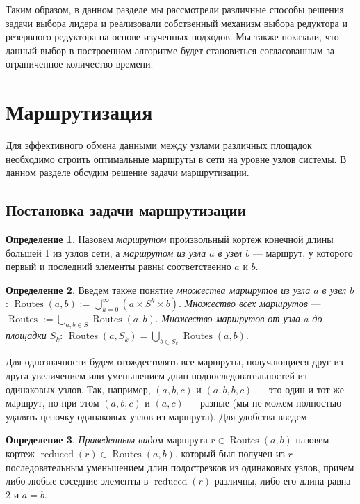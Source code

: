 \documentclass{article}
\theoremstyle{plain}
\theoremstyle{plain}
\theoremstyle{plain}
\theoremstyle{plain}
\theoremstyle{definition}
\newtheorem{definition}{Определение}[section]
\theoremstyle{remark}
\theoremstyle{plain}
\DeclareMathOperator*{\routes}{Routes}
\DeclareMathOperator*{\reduced}{reduced}
\begin{document}
Таким образом, в данном разделе мы рассмотрели различные способы решения задачи выбора лидера и реализовали собственный механизм выбора редуктора и резервного редуктора на основе изученных подходов. Мы также показали, что данный выбор в построенном алгоритме будет становиться согласованным за ограниченное количество времени.

\section{Маршрутизация}
\label{RoutingSection}

Для эффективного обмена данными между узлами различных площадок необходимо строить оптимальные маршруты в сети на уровне узлов системы. В данном разделе обсудим решение задачи маршрутизации.

\subsection{Постановка задачи маршрутизации}

\begin{definition}
    Назовем \textit{маршрутом} произвольный кортеж конечной длины большей 1 из узлов сети, а \textit{маршрутом из узла $a$ в узел $b$} --- маршрут, у которого первый и последний элементы равны соответственно $a$ и $b$.
\end{definition}

\begin{definition}
    Введем также понятие \textit{множества маршрутов из узла $a$ в узел $b$}: $\routes(a, b) := \displaystyle \bigcup_{k = 0}^{\infty} ({a} \times S^k \times {b})$. \textit{Множество всех маршрутов} --- $\routes := \displaystyle \bigcup_{a, b \in S} \routes(a, b)$. \textit{Множество маршрутов от узла $a$ до площадки $S_k$}: $\routes(a, S_k) = \displaystyle \bigcup_{b \in S_k} \routes(a, b)$.
\end{definition}

Для однозначности будем отождествлять все маршруты, получающиеся друг из друга увеличением или уменьшением длин подпоследовательностей из одинаковых узлов. Так, например, $(a, b, c)$ и $(a, b, b, c)$ --- это один и тот же маршрут, но при этом $(a, b, c)$ и $(a, c)$ --- разные (мы не можем полностью удалять цепочку одинаковых узлов из маршрута). Для удобства введем

\begin{definition}
\label{RouteReducedView}
    \textit{Приведенным видом} маршрута $r \in \routes(a, b)$ назовем кортеж $\reduced(r) \in \routes(a, b)$, который был получен из $r$ последовательным уменьшением длин подострезков из одинаковых узлов, причем либо любые соседние элементы в $\reduced(r)$ различны, либо его длина равна 2 и $a = b$.
\end{definition}
\end{document}
